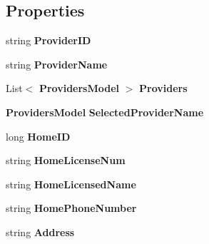 \subsection*{Properties}
\begin{DoxyCompactItemize}
\item 
\mbox{\label{class_a_f_h___scheduler_1_1_data_1_1_new_home_model_ab0751c21ca5dc151f69f3e5fae076bf8}} 
string {\bfseries Provider\+ID}\hspace{0.3cm}{\ttfamily  [get, set]}
\item 
\mbox{\label{class_a_f_h___scheduler_1_1_data_1_1_new_home_model_af9b0951eb0d599e69ceffeb667a17e05}} 
string {\bfseries Provider\+Name}\hspace{0.3cm}{\ttfamily  [get, set]}
\item 
\mbox{\label{class_a_f_h___scheduler_1_1_data_1_1_new_home_model_a2e452563c290a8bee4bde6f9c7b5c69d}} 
List$<$ \textbf{ Providers\+Model} $>$ {\bfseries Providers}\hspace{0.3cm}{\ttfamily  [get, set]}
\item 
\mbox{\label{class_a_f_h___scheduler_1_1_data_1_1_new_home_model_acb21549375d6d80657e2d124fa6b3165}} 
\textbf{ Providers\+Model} {\bfseries Selected\+Provider\+Name}\hspace{0.3cm}{\ttfamily  [get, set]}
\item 
\mbox{\label{class_a_f_h___scheduler_1_1_data_1_1_new_home_model_a94ec1272fc78da2ef62a33287a80974b}} 
long {\bfseries Home\+ID}\hspace{0.3cm}{\ttfamily  [get, set]}
\item 
\mbox{\label{class_a_f_h___scheduler_1_1_data_1_1_new_home_model_a7525c77efbc07339c1c62dade4e5682e}} 
string {\bfseries Home\+License\+Num}\hspace{0.3cm}{\ttfamily  [get, set]}
\item 
\mbox{\label{class_a_f_h___scheduler_1_1_data_1_1_new_home_model_a5fb4c8d1c9a0cb2e8214df0b4bce7929}} 
string {\bfseries Home\+Licensed\+Name}\hspace{0.3cm}{\ttfamily  [get, set]}
\item 
\mbox{\label{class_a_f_h___scheduler_1_1_data_1_1_new_home_model_a17ec29a4711d12bc81169f5f46a8ab8f}} 
string {\bfseries Home\+Phone\+Number}\hspace{0.3cm}{\ttfamily  [get, set]}
\item 
\mbox{\label{class_a_f_h___scheduler_1_1_data_1_1_new_home_model_a3aa26de42e36aaf65ce2a53f3a812974}} 
string {\bfseries Address}\hspace{0.3cm}{\ttfamily  [get, set]}

\end{DoxyCompactItemize}
